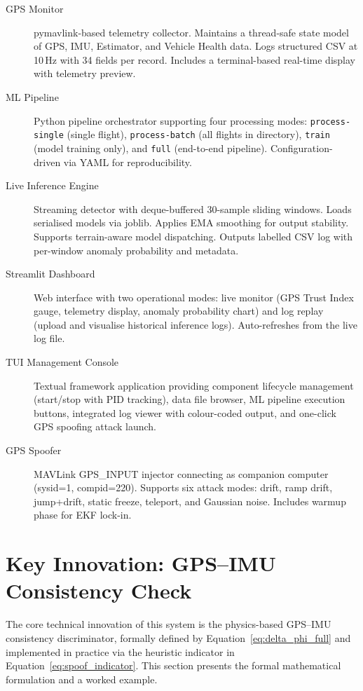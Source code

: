 \begin{description}
    \item[GPS Monitor] pymavlink-based telemetry collector. Maintains a thread-safe state model of GPS, IMU, Estimator, and Vehicle Health data. Logs structured CSV at 10\,Hz with 34 fields per record. Includes a terminal-based real-time display with telemetry preview.
    \item[ML Pipeline] Python pipeline orchestrator supporting four processing modes: \texttt{process-single} (single flight), \texttt{process-batch} (all flights in directory), \texttt{train} (model training only), and \texttt{full} (end-to-end pipeline). Configuration-driven via YAML for reproducibility.
    \item[Live Inference Engine] Streaming detector with deque-buffered 30-sample sliding windows. Loads serialised models via joblib. Applies EMA smoothing for output stability. Supports terrain-aware model dispatching. Outputs labelled CSV log with per-window anomaly probability and metadata.
    \item[Streamlit Dashboard] Web interface with two operational modes: live monitor (GPS Trust Index gauge, telemetry display, anomaly probability chart) and log replay (upload and visualise historical inference logs). Auto-refreshes from the live log file.
    \item[TUI Management Console] Textual framework application providing component lifecycle management (start/stop with PID tracking), data file browser, ML pipeline execution buttons, integrated log viewer with colour-coded output, and one-click GPS spoofing attack launch.
    \item[GPS Spoofer] MAVLink GPS\_INPUT injector connecting as companion computer (sysid=1, compid=220). Supports six attack modes: drift, ramp drift, jump+drift, static freeze, teleport, and Gaussian noise. Includes warmup phase for EKF lock-in.
\end{description}

\section{Key Innovation: GPS--IMU Consistency Check}

The core technical innovation of this system is the physics-based GPS--IMU consistency discriminator, formally defined by Equation~\ref{eq:delta_phi_full} and implemented in practice via the heuristic indicator in Equation~\ref{eq:spoof_indicator}. This section presents the formal mathematical formulation and a worked example.

